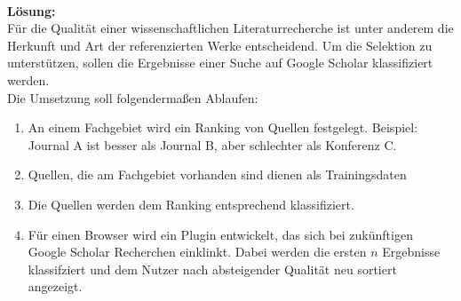 \\
\textbf{Lösung:} \\
Für die Qualität einer wissenschaftlichen Literaturrecherche ist unter anderem 
die Herkunft und Art der referenzierten Werke entscheidend. Um die 
Selektion zu unterstützen, sollen die Ergebnisse einer Suche auf Google Scholar 
klassifiziert werden. \\
Die Umsetzung soll folgendermaßen Ablaufen:
\begin{enumerate}
	\item An einem Fachgebiet wird ein Ranking von Quellen festgelegt. 
Beispiel: Journal A ist besser als Journal B, aber schlechter als Konferenz C.
	\item Quellen, die am Fachgebiet vorhanden sind dienen als 
Trainingsdaten
	\item Die Quellen werden dem Ranking entsprechend klassifiziert. 
	\item Für einen Browser wird ein Plugin entwickelt, das sich bei 
zukünftigen Google Scholar Recherchen einklinkt. Dabei werden die ersten $n$ 
Ergebnisse klassifziert und dem Nutzer nach absteigender Qualität neu sortiert 
angezeigt.
\end{enumerate}
